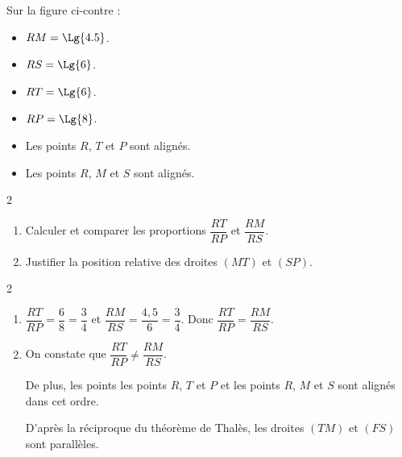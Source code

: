 \begin{exercice*}
    \phantom{rrr}

    \vspace*{-5mm}
    \hspace*{-13mm}
    \begin{minipage}{0.65\linewidth}
        Sur la figure ci-contre :
        \begin{itemize}
            \item $RM=\Lg{4.5}$.
            \item $RS=\Lg{6}$.
            \item $RT=\Lg{6}$.
            \item $RP=\Lg{8}$.
            \item Les points $R$, $T$ et $P$ sont alignés.
            \item Les points $R$, $M$ et $S$ sont alignés.            
        \end{itemize}
    \end{minipage}
    \begin{minipage}{0.35\linewidth}        
    \end{minipage}

    \begin{spacing}2
    \begin{enumerate}
        \item Calculer et comparer les proportions $\dfrac{RT}{RP}$ et $\dfrac{RM}{RS}$.
        \item Justifier la position relative des droites $(MT)$ et $(SP)$.
    \end{enumerate}
    \end{spacing}
\end{exercice*}
\begin{corrige}
    \phantom{rrr}
    \begin{spacing}2
    \begin{enumerate}
        \item $\dfrac{RT}{RP}=\dfrac{6}{8}=\dfrac{3}{4}$ et $\dfrac{RM}{RS}=\dfrac{4,5}{6}=\dfrac{3}{4}$. Donc $\dfrac{RT}{RP}=\dfrac{RM}{RS}$.
        \item On constate que $\dfrac{RT}{RP}\neq\dfrac{RM}{RS}$.
        
        De plus, les points les points $R$, $T$ et $P$ et les points $R$, $M$ et $S$ sont alignés dans cet ordre.            

        D'après la réciproque du théorème de Thalès, les droites $(TM)$ et $(FS)$ sont parallèles.
    \end{enumerate}  
    \end{spacing}
\end{corrige}

